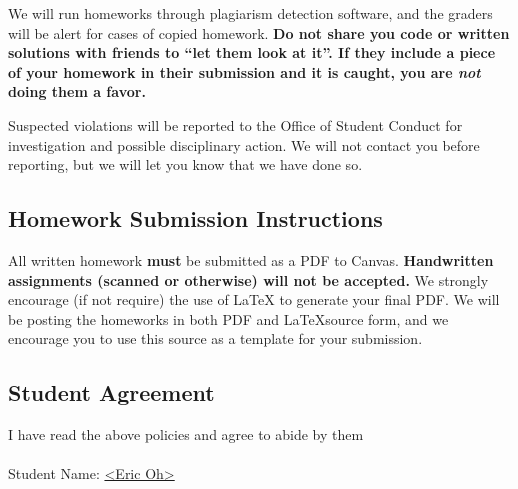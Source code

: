 \documentclass[english]{article}
\begin{document}
We will run homeworks through plagiarism detection software, and the graders will be alert for cases of copied homework.
{\bf Do not share you code or written solutions  with friends to ``let them look at it''. If they include a piece of your
homework in their submission and it is caught, you are {\it not} doing them a favor.}

Suspected violations will be reported to the Office of Student Conduct
for investigation and possible disciplinary action. We will not
contact you before reporting, but we will let you know that we have
done so.

\subsection*{Homework Submission Instructions}

All written homework {\bf must} be submitted as a PDF to Canvas. {\bf
  Handwritten assignments (scanned or otherwise) will not be
  accepted.}  We strongly encourage (if not require) the use of \LaTeX
to generate your final PDF. We will be posting the homeworks in both
PDF and \LaTeX source form, and we encourage you to use this source as
a template for your submission.

\subsection*{Student Agreement}
I have read the above policies and agree to abide by them
\\ \\
Student Name: \underline{\textless Eric Oh\textgreater}
\end{document}
